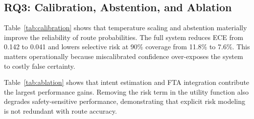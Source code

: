 \documentclass[conference]{IEEEtran}
\begin{document}
\subsection{RQ3: Calibration, Abstention, and Ablation}
Table~\ref{tab:calibration} shows that temperature scaling and abstention materially improve the reliability of route probabilities. The full system reduces ECE from 0.142 to 0.041 and lowers selective risk at 90\% coverage from 11.8\% to 7.6\%. This matters operationally because miscalibrated confidence over-exposes the system to costly false certainty.

\begin{table}[t]
\centering
\caption{Calibration and selective prediction analysis. Lower is better except coverage.}
\label{tab:calibration}
\end{table}

Table~\ref{tab:ablation} shows that intent estimation and FTA integration contribute the largest performance gains. Removing the risk term in the utility function also degrades safety-sensitive performance, demonstrating that explicit risk modeling is not redundant with route accuracy.

\begin{table}[t]
\centering
\caption{Ablation results for core ResolveAgent components.}
\label{tab:ablation}
\end{table}
\end{document}
